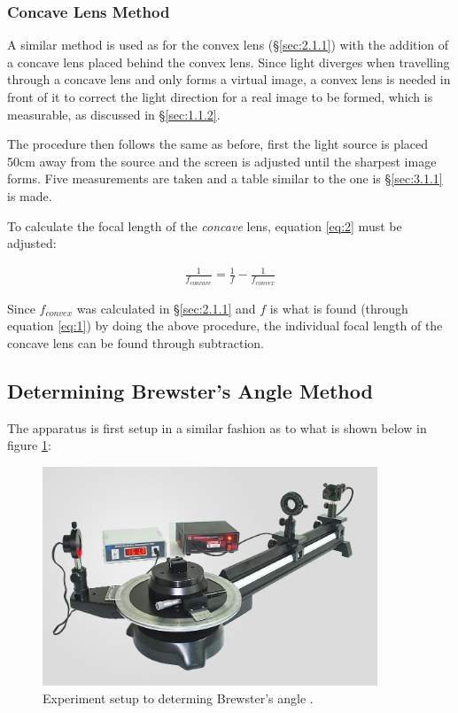 \documentclass[12pt]{article}
\begin{document}
\subsubsection{Concave Lens Method} \label{sec:2.1.2}

A similar method is used as for the convex lens (§\ref{sec:2.1.1}) with the addition of a concave lens placed behind the convex lens.
Since light diverges when travelling through a concave lens and only forms a virtual image, a convex lens is needed in front of it to correct the light direction for a real image to be formed, which is measurable, as discussed in §\ref{sec:1.1.2}.

The procedure then follows the same as before, first the light source is placed 50cm away from the source and the screen is adjusted until the sharpest image forms.
Five measurements are taken and a table similar to the one is §\ref{sec:3.1.1} is made.

To calculate the focal length of the \textit{concave} lens, equation \ref{eq:2} must be adjusted:

\begin{gather} \label{eq:9}
    \frac{1}{f_{concave}} = \frac{1}{f} - \frac{1}{f_{convex}}
\end{gather}

Since $f_{convex}$ was calculated in §\ref{sec:2.1.1} and $f$ is what is found (through equation \ref{eq:1}) by doing the above procedure, the individual focal
length of the concave lens can be found through subtraction.

\subsection{Determining Brewster's Angle Method} \label{sec:2.2}

The apparatus is first setup in a similar fashion as to what is shown below in figure \ref{fig:brewexp}:

\begin{figure}[H]
    \centering
    \includegraphics[width=10cm]{brewster exp.png}
    \caption{\centering Experiment setup to determing Brewster's angle \protect\cite{holmarcexp}.}
    \label{fig:brewexp}
\end{figure}
\end{document}
